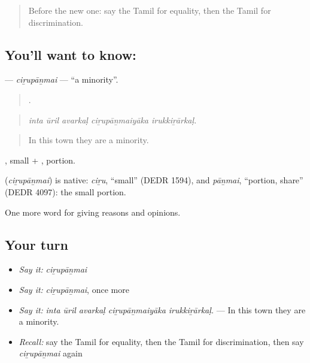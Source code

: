 \label{lesson:TA-C371-cirupanmai}



\begin{quote}
Before the new one: say the Tamil for equality, then the Tamil for discrimination.
\end{quote}

\subsection*{You'll want to know: }
\textbf{} — \emph{ciṟupāṉmai} — \textquotedblleft{}a minority\textquotedblright{}.

\begin{quote}
    .
\end{quote}

\begin{quote}
\emph{inta ūril avarkaḷ ciṟupāṉmaiyāka irukkiṟārkaḷ.}
\end{quote}

\begin{quote}
In this town they are a minority.
\end{quote}

, small + , portion.

\begin{cousinweb}
\textbf{} (\emph{ciṟupāṉmai}) is native: \emph{ciṟu}, \textquotedblleft{}small\textquotedblright{} (DEDR 1594), and \emph{pāṉmai}, \textquotedblleft{}portion, share\textquotedblright{} (DEDR 4097): the small portion.
\end{cousinweb}

\begin{grammarlens}[title={What you've built}]
One more word for giving reasons and opinions.
\end{grammarlens}

\subsection*{Your turn}
\begin{itemize}
\raggedright
  \item \emph{Say it:} \emph{ciṟupāṉmai}
  \item \emph{Say it:} \emph{ciṟupāṉmai}, once more
  \item \emph{Say it:} \emph{inta ūril avarkaḷ ciṟupāṉmaiyāka irukkiṟārkaḷ.} — In this town they are a minority.
  \item \emph{Recall:} say the Tamil for equality, then the Tamil for discrimination, then say \emph{ciṟupāṉmai} again
\end{itemize}

